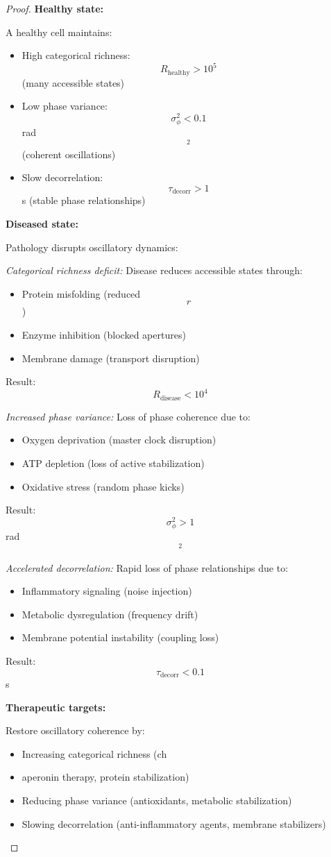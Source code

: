 \documentclass[12pt,a4paper]{article}
\begin{document}
\begin{proof}
\textbf{Healthy state:}

A healthy cell maintains:
\begin{itemize}
\item High categorical richness: $$R_{\text{healthy}} > 10^5$$ (many accessible states)
\item Low phase variance: $$\sigma_\phi^2 < 0.1$$ rad$$^2$$ (coherent oscillations)
\item Slow decorrelation: $$\tau_{\text{decorr}} > 1$$ s (stable phase relationships)
\end{itemize}

\textbf{Diseased state:}

Pathology disrupts oscillatory dynamics:

\textit{Categorical richness deficit:} Disease reduces accessible states through:
\begin{itemize}
\item Protein misfolding (reduced $$r$$)
\item Enzyme inhibition (blocked apertures)
\item Membrane damage (transport disruption)
\end{itemize}

Result: $$R_{\text{disease}} < 10^4$$

\textit{Increased phase variance:} Loss of phase coherence due to:
\begin{itemize}
\item Oxygen deprivation (master clock disruption)
\item ATP depletion (loss of active stabilization)
\item Oxidative stress (random phase kicks)
\end{itemize}

Result: $$\sigma_\phi^2 > 1$$ rad$$^2$$

\textit{Accelerated decorrelation:} Rapid loss of phase relationships due to:
\begin{itemize}
\item Inflammatory signaling (noise injection)
\item Metabolic dysregulation (frequency drift)
\item Membrane potential instability (coupling loss)
\end{itemize}

Result: $$\tau_{\text{decorr}} < 0.1$$ s

\textbf{Therapeutic targets:}

Restore oscillatory coherence by:
\begin{itemize}
\item Increasing categorical richness (ch
\item aperonin therapy, protein stabilization)
\item Reducing phase variance (antioxidants, metabolic stabilization)
\item Slowing decorrelation (anti-inflammatory agents, membrane stabilizers)
\end{itemize}
\end{proof}
\end{document}
